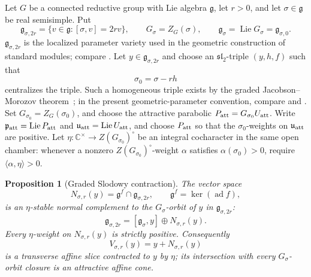 \documentclass[11pt]{amsart}
\newtheorem{proposition}[theorem]{Proposition}
\theoremstyle{definition}
\theoremstyle{remark}
\begin{document}
Let $G$ be a connected reductive group with Lie algebra $\mathfrak g$, let
$r>0$, and let $\sigma\in\mathfrak g$ be real semisimple.  Put
\[
 \mathfrak g_{\sigma,2r}=\{v\in\mathfrak g:[\sigma,v]=2rv\},
 \qquad G_\sigma=Z_G(\sigma),\qquad
 \mathfrak g_\sigma=\operatorname{Lie}G_\sigma=\mathfrak g_{\sigma,0}.
\]
$\mathfrak g_{\sigma,2r}$ is the localized parameter variety used in the geometric construction
of standard modules; compare \cite[Sections~2--4]{Solleveld}.  Let
$y\in\mathfrak g_{\sigma,2r}$ and choose an $\mathfrak{sl}_2$-triple
$(y,h,f)$ such that
\[
 \sigma_0=\sigma-rh
\]
centralizes the triple.  Such a homogeneous triple exists by the graded
Jacobson--Morozov theorem~\cite[Theorem~1]{Vinberg}; in the present
geometric-parameter convention, compare
\cite[equation~(26) and Proposition~3.5(c)]{AMS} and
\cite[equation~(3.6) and Lemma~B.3]{Solleveld}.  Set
$G_{\sigma_0}=Z_G(\sigma_0)$, and choose the attractive
parabolic $P_{\rm att}=G_{\sigma_0} U_{\rm att}$.  Write
$\mathfrak p_{\rm att}=\operatorname{Lie}P_{\rm att}$ and
$\mathfrak u_{\rm att}=\operatorname{Lie}U_{\rm att}$, and choose
$P_{\rm att}$ so that the $\sigma_0$-weights on
$\mathfrak u_{\rm att}$ are positive.
Let $\eta:\mathbb C^\times\to Z(G_{\sigma_0})^\circ$ be an integral cocharacter in the
same open chamber: whenever a nonzero $Z(G_{\sigma_0})^\circ$-weight $\alpha$ satisfies
$\alpha(\sigma_0)>0$, require $\langle\alpha,\eta\rangle>0$.

\begin{proposition}[Graded Slodowy contraction]
\label{prop:general-graded-slodowy}
The vector space
\[
N_{\sigma,r}(y)=\mathfrak g^f\cap\mathfrak g_{\sigma,2r},
\qquad \mathfrak g^f=\ker(\operatorname{ad}f),
\]
is an $\eta$-stable normal complement to the $G_\sigma$-orbit of $y$ in
$\mathfrak g_{\sigma,2r}$:
\begin{equation}\label{eq:general-slodowy-splitting}
 \mathfrak g_{\sigma,2r}
 =[\mathfrak g_\sigma,y]\oplus N_{\sigma,r}(y).
\end{equation}
Every $\eta$-weight on $N_{\sigma,r}(y)$ is strictly positive.  Consequently
\[
 V_{\sigma,r}(y)=y+N_{\sigma,r}(y)
\]
is a transverse affine slice contracted to $y$ by $\eta$; its intersection
with every $G_\sigma$-orbit closure is an attractive affine cone.
\end{proposition}
\end{document}
